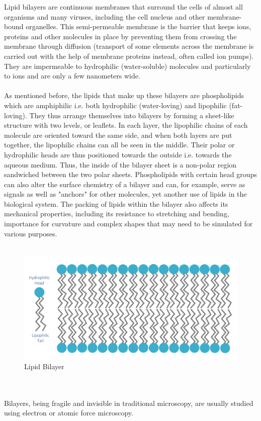 \documentclass[12pt, a4paper]{report}
\begin{document}
Lipid bilayers are continuous membranes that surround the cells of almost all organisms and many viruses, including the cell nucleus and other membrane-bound organelles. This semi-permeable membrane is the barrier that keeps ions, proteins and other molecules in place by preventing them from crossing the membrane through diffusion (transport of some elements across the membrane is carried out with the help of membrane proteins instead, often called ion pumps). They are impermeable to hydrophilic (water-soluble) molecules and particularly to ions and are only a few nanometers wide.
\\~\\
As mentioned before, the lipids that make up these bilayers are phospholipids which are amphiphilic i.e. both hydrophilic (water-loving) and lipophilic (fat-loving). They thus arrange themselves into bilayers by forming a sheet-like structure with two levels, or leaflets. In each layer, the lipophilic chains of each molecule are oriented toward the same side, and when both layers are put together, the lipophilic chains can all be seen in the middle. Their polar or hydrophilic heads are thus positioned towards the outside i.e. towards the aqueous medium. Thus, the inside of the bilayer sheet is a non-polar region sandwiched between the two polar sheets.  Phospholipids with certain head groups can also alter the surface chemistry of a bilayer and can, for example, serve as signals as well as "anchors" for other molecules, yet another use of lipids in the biological system. The packing of lipids within the bilayer also affects its mechanical properties, including its resistance to stretching and bending, importance for curvature and complex shapes that may need to be simulated for various purposes. 
\\~\\
\begin{figure}[h]
\includegraphics[scale=0.5]{images/lipid bilayer custom.png} 
\centering 
\caption{Lipid Bilayer} 
\centering 
\end{figure} 
\\~\\ 
Bilayers, being fragile and invisible in traditional microscopy, are usually studied using electron or atomic force microscopy. \\~\\
\end{document}
